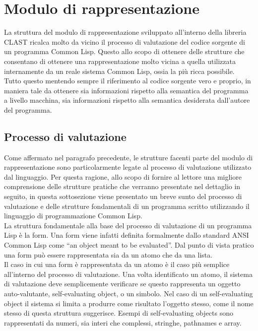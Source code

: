 \section{Modulo di rappresentazione}

La struttura del modulo di rappresentazione sviluppato all’interno della
libreria CLAST ricalca molto da vicino il processo di valutazione del codice
sorgente di un programma Common Lisp. Questo allo scopo di ottenere delle
strutture che consentano di ottenere una rappresentazione molto vicina a
quella utilizzata internamente da un reale sistema Common Lisp, ossia la più
ricca possibile. Tutto questo mentendo sempre il riferimento al codice
sorgente vero e proprio, in maniera tale da ottenere sia informazioni rispetto
alla semantica del programma a livello macchina, sia informazioni rispetto
alla semantica desiderata dall’autore del programma.

\subsection{Processo di valutazione}

Come affermato nel paragrafo precedente, le strutture facenti parte del modulo
di rappresentazione sono particolarmente legate al processo di valutazione
utilizzato dal linguaggio. Per questa ragione, allo scopo di fornire al
lettore una migliore comprensione delle strutture pratiche che verranno
presentate nel dettaglio in seguito, in questa sottosezione viene presentato
un breve sunto del processo di valutazione e delle strutture fondamentali di
un programma scritto utilizzando il linguaggio di programmazione Common
Lisp.\\

La struttura fondamentale alla base del processo di valutazione di un
programma Lisp è la form. Una form viene infatti definita formalmente dallo
standard ANSI Common Lisp come “an object meant to be evaluated”. Dal punto di
vista pratico una form può essere rappresentata sia da un atomo che da una
lista.\\

Il caso in cui una form è rappresentata da un atomo è il caso più semplice
all’interno del processo di valutazione. Una volta identificato un atomo, il
sistema di valutazione deve semplicemente verificare se questo rappresenta un
oggetto auto-valutante, self-evaluating object, o un simbolo. Nel caso di un
self-evaluating object il sistema si limita a produrre come risultato
l’oggetto stesso, come il nome stesso di questa struttura suggerisce. Esempi
di self-evaluating objects sono rappresentati da numeri, sia interi che
complessi, stringhe, pathnames e array.

